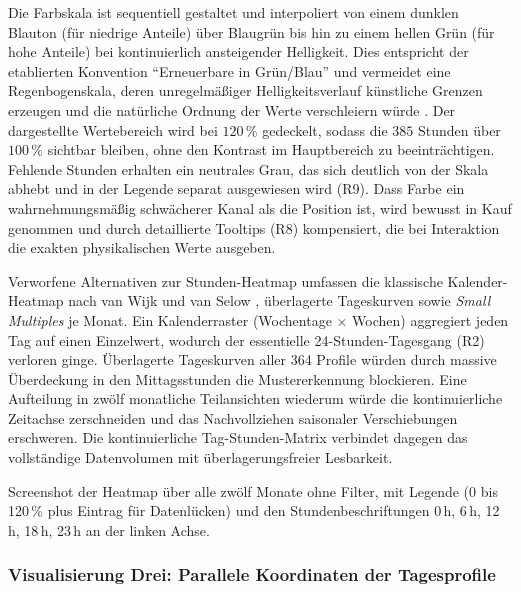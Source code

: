 Die Farbskala ist sequentiell gestaltet und interpoliert von einem dunklen Blauton (für niedrige Anteile)
über Blaugrün bis hin zu einem hellen Grün (für hohe Anteile) bei kontinuierlich ansteigender Helligkeit.
Dies entspricht der etablierten Konvention \enquote{Erneuerbare in Grün/Blau} und vermeidet eine
Regenbogenskala, deren unregelmäßiger Helligkeitsverlauf künstliche Grenzen erzeugen und die natürliche
Ordnung der Werte verschleiern würde \cite{Borland2007,Harrower2003}. Der dargestellte Wertebereich wird
bei $120\,\%$ gedeckelt, sodass die $385$ Stunden über $100\,\%$ sichtbar bleiben, ohne den Kontrast im
Hauptbereich zu beeinträchtigen. Fehlende Stunden erhalten ein neutrales Grau, das sich deutlich von
der Skala abhebt und in der Legende separat ausgewiesen wird (R9). Dass Farbe ein wahrnehmungsmäßig
schwächerer Kanal als die Position ist, wird bewusst in Kauf genommen und durch detaillierte Tooltips
(R8) kompensiert, die bei Interaktion die exakten physikalischen Werte ausgeben.

Verworfene Alternativen zur Stunden-Heatmap umfassen die klassische Kalender-Heatmap nach van Wijk und van Selow \cite{vanWijk1999}, überlagerte Tageskurven sowie \emph{Small Multiples} je Monat. Ein Kalenderraster (Wochentage $\times$ Wochen) aggregiert jeden Tag auf einen Einzelwert, wodurch der essentielle 24-Stunden-Tagesgang (R2) verloren ginge. Überlagerte Tageskurven aller 364 Profile würden durch massive Überdeckung in den Mittagsstunden die Mustererkennung blockieren. Eine Aufteilung in zwölf monatliche Teilansichten wiederum würde die kontinuierliche Zeitachse zerschneiden und das Nachvollziehen saisonaler Verschiebungen erschweren. Die kontinuierliche Tag-Stunden-Matrix verbindet dagegen das vollständige Datenvolumen mit überlagerungsfreier Lesbarkeit.

{Screenshot der Heatmap über alle zwölf Monate ohne Filter, mit Legende (0 bis 120\,\% plus Eintrag
für Datenlücken) und den Stundenbeschriftungen 0\,h, 6\,h, 12\,h, 18\,h, 23\,h an der linken Achse.}

\subsubsection{Visualisierung Drei: Parallele Koordinaten der Tagesprofile}\label{sec:vis3}

